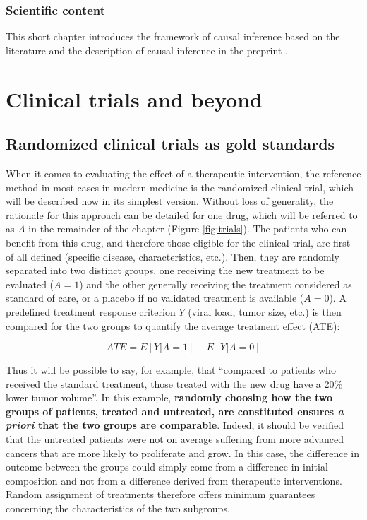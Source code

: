 \documentclass[a4paper,12pt,twoside,onecolumn,openright,final,oldfontcommands]{memoir}
\let\BeginKnitrBlock\begin \let\EndKnitrBlock\end
\begin{document}
\BeginKnitrBlock{summarybox}
\subsubsection*{Scientific content}\label{scientific-content-5}

This short chapter introduces the framework of causal inference based on
the literature and the description of causal inference in the preprint
\citet{beal2020causal}.
\EndKnitrBlock{summarybox}

\newcommand{\indep}{\perp \!\!\! \perp}

\section{Clinical trials and beyond}\label{clinical-trials-and-beyond}

\subsection{Randomized clinical trials as gold
standards}\label{randomized-clinical-trials-as-gold-standards}

When it comes to evaluating the effect of a therapeutic intervention,
the reference method in most cases in modern medicine is the randomized
clinical trial, which will be described now in its simplest version.
Without loss of generality, the rationale for this approach can be
detailed for one drug, which will be referred to as \(A\) in the
remainder of the chapter (Figure \ref{fig:trials}). The patients who can
benefit from this drug, and therefore those eligible for the clinical
trial, are first of all defined (specific disease, characteristics,
etc.). Then, they are randomly separated into two distinct groups, one
receiving the new treatment to be evaluated (\(A=1\)) and the other
generally receiving the treatment considered as standard of care, or a
placebo if no validated treatment is available (\(A=0\)). A predefined
treatment response criterion \(Y\) (viral load, tumor size, etc.) is
then compared for the two groups to quantify the average treatment
effect (ATE):

\[ATE= E[Y|A=1]-E[Y|A=0]\]

Thus it will be possible to say, for example, that ``compared to
patients who received the standard treatment, those treated with the new
drug have a 20\% lower tumor volume''. In this example, \textbf{randomly
choosing how the two groups of patients, treated and untreated, are
constituted ensures \emph{a priori} that the two groups are comparable}.
Indeed, it should be verified that the untreated patients were not on
average suffering from more advanced cancers that are more likely to
proliferate and grow. In this case, the difference in outcome between
the groups could simply come from a difference in initial composition
and not from a difference derived from therapeutic interventions. Random
assignment of treatments therefore offers minimum guarantees concerning
the characteristics of the two subgroups.
\end{document}
